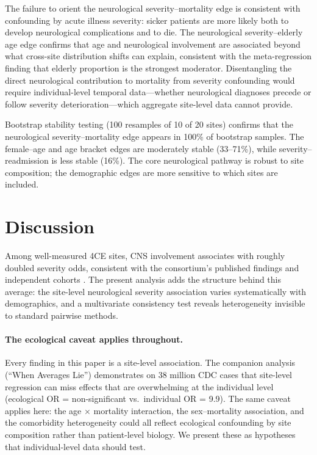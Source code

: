 \documentclass{article}
\begin{document}
The failure to orient the neurological severity--mortality edge is consistent with confounding by acute illness severity: sicker patients are more likely both to develop neurological complications and to die.
The neurological severity--elderly age edge confirms that age and neurological involvement are associated beyond what cross-site distribution shifts can explain, consistent with the meta-regression finding that elderly proportion is the strongest moderator.
Disentangling the direct neurological contribution to mortality from severity confounding would require individual-level temporal data---whether neurological diagnoses precede or follow severity deterioration---which aggregate site-level data cannot provide.

Bootstrap stability testing (100 resamples of 10 of 20 sites) confirms that the neurological severity--mortality edge appears in 100\% of bootstrap samples.
The female--age and age bracket edges are moderately stable (33--71\%), while severity--readmission is less stable (16\%).
The core neurological pathway is robust to site composition; the demographic edges are more sensitive to which sites are included.


\section{Discussion}

Among well-measured 4CE sites, CNS involvement associates with roughly doubled severity odds, consistent with the consortium's published findings \cite{four_ce_neuro2021} and independent cohorts \cite{frontera2021neuro, mao2020neuro}.
The present analysis adds the structure behind this average: the site-level neurological severity association varies systematically with demographics, and a multivariate consistency test reveals heterogeneity invisible to standard pairwise methods.

\paragraph{The ecological caveat applies throughout.}
Every finding in this paper is a site-level association.
The companion analysis (``When Averages Lie'') demonstrates on 38 million CDC cases that site-level regression can miss effects that are overwhelming at the individual level (ecological OR = non-significant vs.\ individual OR = 9.9).
The same caveat applies here: the age $\times$ mortality interaction, the sex--mortality association, and the comorbidity heterogeneity could all reflect ecological confounding by site composition rather than patient-level biology.
We present these as hypotheses that individual-level data should test.
\end{document}
